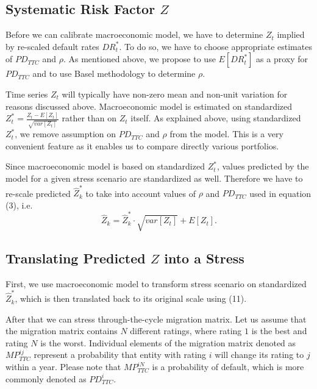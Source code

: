 \documentclass[a4paper]{article}
\begin{document}
\subsection{Systematic Risk Factor $Z$}

Before we can calibrate macroeconomic model, we have to determine $Z_t$ implied by re-scaled default rates $DR^*_t$. To do so, we have to choose appropriate estimates of $PD_{TTC}$ and $\rho$. As mentioned above, we propose to use $E[DR^*_t]$ as a proxy for $PD_{TTC}$ and to use Basel methodology to determine $\rho$.

Time series $Z_t$ will typically have non-zero mean and non-unit variation for reasons discussed above. Macroeconomic model is estimated on standardized $Z^*_t = \frac{Z_t - E[Z_t]}{\sqrt{var[Z_t]}}$ rather than on $Z_t$ itself. As explained above, using standardized $Z^*_t$, we remove assumption on $PD_{TTC}$ and $\rho$ from the model. This is a very convenient feature as it enables us to compare directly various portfolios.

Since macroeconomic model is based on standardized $Z_t^*$, values predicted by the model for a given stress scenario are standardized as well. Therefore we have to re-scale predicted $\hat{Z}^*_k$ to take into account values of $\rho$ and $PD_{TTC}$ used in equation (3), i.e.
\begin{equation}
\hat{Z}_k = \hat{Z}^*_k \cdot \sqrt{var[Z_t]} + E[Z_t].
\end{equation}

\subsection{Translating Predicted $Z$ into a Stress}

First, we use macroeconomic model to transform stress scenario on standardized $\hat{Z}^*_k$, which is then translated back to its original scale using (11).

After that we can stress through-the-cycle migration matrix. Let us assume that the migration matrix contains $N$ different ratings, where rating $1$ is the best and rating $N$ is the worst. Individual elements of the migration matrix denoted as $MP^{ij}_{TTC}$ represent a probability that entity with rating $i$ will change its rating to $j$ within a year. Please note that $MP^{iN}_{TTC}$ is a probability of default, which is more commonly denoted as $PD^i_{TTC}$.
\end{document}
